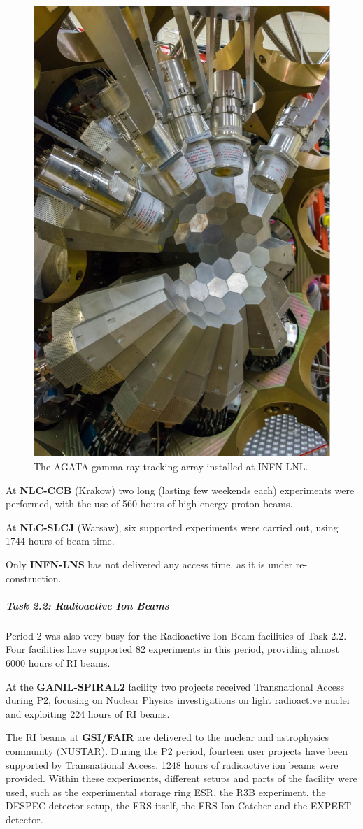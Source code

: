 \begin{figure}[!h]
    \centering
    \includegraphics[width=0.5\linewidth]{graphics/AGATA_LNL.png}
    \caption{The AGATA gamma-ray tracking array installed at INFN-LNL.}
    \label{fig:AGATA_LNL}
\end{figure}

At \textbf{NLC-CCB} (Krakow) two long (lasting few weekends each) experiments were performed, with the use of 560 hours of high energy proton beams. 

At \textbf{NLC-SLCJ} (Warsaw), six supported experiments were carried out, using 1744 hours of beam time.

Only \textbf{INFN-LNS} has not delivered any access time, as it is under re-construction.

\subparagraph{Task 2.2: Radioactive Ion Beams} \mbox{}


Period 2 was also very busy for the Radioactive Ion Beam facilities of Task 2.2. Four facilities have supported 82 experiments in this period, providing almost 6000 hours of RI beams. 

At the \textbf{GANIL-SPIRAL2} facility two projects received Transnational Access during P2, focusing on Nuclear Physics investigations on light radioactive nuclei and exploiting 224 hours of RI beams.

The RI beams at \textbf{GSI/FAIR} are delivered to the nuclear and astrophysics community (NUSTAR). During the P2 period, fourteen user projects have been supported by Transnational Access. 1248 hours of radioactive ion beams were provided. Within these experiments, different setups and parts of the facility were used, such as the experimental storage ring ESR, the R3B experiment, the DESPEC detector setup, the FRS itself, the FRS Ion Catcher and the EXPERT detector. 

